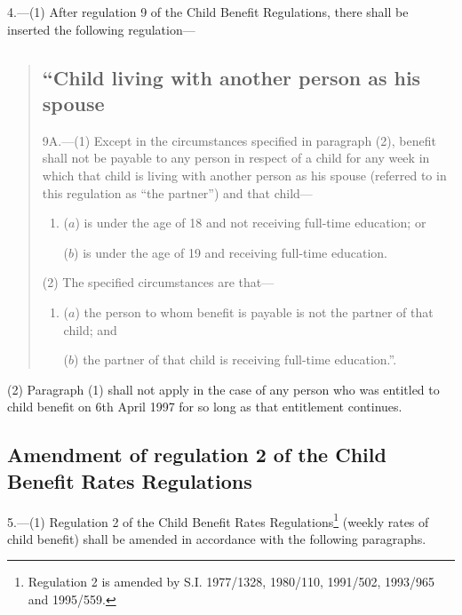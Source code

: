 \documentclass[12pt,a4paper]{article}
\begin{document}
4.—(1) After regulation 9 of the Child Benefit Regulations, there shall be inserted the following regulation—
\begin{quotation}
\subsection*{“Child living with another person as his spouse}

9A.—(1) Except in the circumstances specified in paragraph (2), benefit shall not be payable to any person in respect of a child for any week in which that child is living with another person as his spouse (referred to in this regulation as “the partner”) and that child—
\begin{enumerate}\item[]
($a$) is under the age of 18 and not receiving full-time education; or

($b$) is under the age of 19 and receiving full-time education.
\end{enumerate}

(2) The specified circumstances are that—
\begin{enumerate}\item[]
($a$) the person to whom benefit is payable is not the partner of that child; and

($b$) the partner of that child is receiving full-time education.”.
\end{enumerate}
\end{quotation}

(2) Paragraph (1) shall not apply in the case of any person who was entitled to child benefit on 6th April 1997 for so long as that entitlement continues.

\subsection[5. Amendment of regulation 2 of the Child Benefit Rates Regulations]{Amendment of regulation 2 of the Child Benefit Rates Regulations}

5.—(1) Regulation 2 of the Child Benefit Rates Regulations\footnote{\frenchspacing Regulation 2 is amended by S.I. 1977/1328, 1980/110, 1991/502, 1993/965 and 1995/559.} (weekly rates of child benefit) shall be amended in accordance with the following paragraphs.
\end{document}
